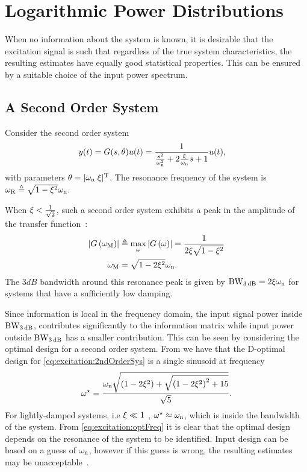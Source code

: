 \section{Logarithmic Power Distributions}
\label{sec:excitation:logarithmic}
When no information about the system is known, it is desirable that the excitation signal is such that regardless of the true system characteristics, the resulting estimates have equally good statistical properties.
This can be ensured by a suitable choice of the input power spectrum.

 \subsection{A Second Order System}
Consider the second order system
\begin{align}
y(t) 
  &= 
  G(s,\theta) u(t) 
  = \frac{1}
                {\frac{s^2}{\omega_{\mathrm{n}}^2} + 2\frac{\xi_{}}{\omega_{\mathrm{n}}}s + 1}
      u(t),
\label{eq:excitation:2ndOrderSys}
\end{align}
with parameters $\theta=[\omega_{\mathrm{n}}\;\xi_{}]^{\mathrm{T}}$. 
The resonance frequency of the system is $\omega_{\mathrm{R}} \triangleq \sqrt{1-\xi_{}^2}\omega_{\mathrm{n}}$.
  
When $\xi_{} < \frac{1}{\sqrt{2}}$, such a second order system exhibits a peak in the amplitude of the transfer function~\citep{Oppenheim1996}:
  \begin{align}
   \left| G\left(\omega_{\mathrm{M}} \right)  \right|
   & \triangleq
          \max_{\omega} 
            \left| G\left( \omega \right) \right|  
        = \frac{1}
               {2 \xi_{} \sqrt{1-\xi_{}^2}}
               \label{eq:excitation:peakAmplitude}\\
   \omega_{\mathrm{M}} &
        = \sqrt{1-2\xi_{}^2} \omega_{\mathrm{n}}
        \label{eq:excitation:peakFrequency}
    \text{.}
  \end{align}
  The $3\unit{dB}$ bandwidth around this resonance peak is given by $\mathrm{BW}_{3\,\mathrm{dB}} = 2\xi_{}\omega_{\mathrm{n}}$ for systems that have a sufficiently low damping.

Since information is local in the frequency domain, the input signal power inside $\mathrm{BW}_{3\,\mathrm{dB}}$, contributes significantly to the information matrix while input power outside $\mathrm{BW}_{3\,\mathrm{dB}}$ has a smaller contribution. This can be seen by considering the optimal design for a second order system. From \citep[Example 6.4.5]{Goodwin1977} we have that the D-optimal design for \eqref{eq:excitation:2ndOrderSys} is a single sinusoid at frequency
\begin{align}
\omega^\star =
\frac{\omega_{\mathrm{n}}   \sqrt{     \left(1-2\xi_{}^2\right)      +     \sqrt{\left(1-2\xi_{}^2\right)^2+15}    }}
{\sqrt{5}}
\label{eq:excitation:optFreq}
\text{.}
\end{align}
For lightly-damped systems, i.e $\xi_{} \ll 1$ , $\omega^\star\approx \omega_{\mathrm{n}}$, which is inside the bandwidth of the system. 
From \eqref{eq:excitation:optFreq} it is clear that the optimal design depends on the resonance of the system to be identified. 
Input design can be based on a guess of $\omega_{\mathrm{n}}$, however if this guess is wrong, the resulting estimates may be unacceptable~\citep{Rojas2007}.

